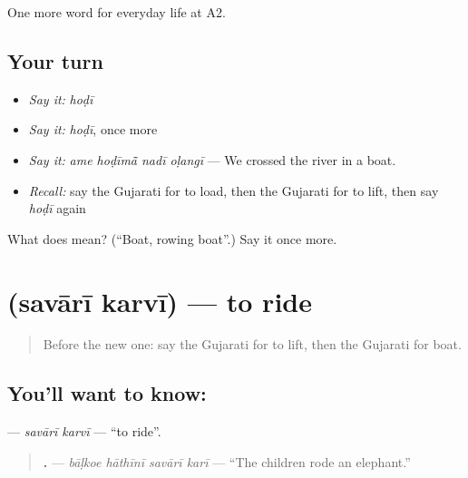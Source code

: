 \begin{grammarlens}[title={What you've built}]
One more word for everyday life at A2.
\end{grammarlens}

\subsection*{Your turn}
\begin{itemize}
\raggedright
  \item \emph{Say it:} \emph{hoḍī}
  \item \emph{Say it:} \emph{hoḍī}, once more
  \item \emph{Say it:} \emph{ame hoḍīmā̃ nadī oḷangī} — We crossed the river in a boat.
  \item \emph{Recall:} say the Gujarati for to load, then the Gujarati for to lift, then say \emph{hoḍī} again
\end{itemize}

\begin{tcolorbox}[breakable,colback=teal!4,colframe=teal!35!black,title={Before you move on}]
What does  mean? (\textquotedblleft{}Boat, rowing boat\textquotedblright{}.) Say it once more.
\end{tcolorbox}
\section[\texorpdfstring{\gu{સવારી} \gu{કરવી} (savārī karvī)}{સવારી કરવી (savārī karvī)}]{  (savārī karvī) — to ride}

\label{lesson:GU-C211-savari-karvi}



\begin{quote}
Before the new one: say the Gujarati for to lift, then the Gujarati for boat.
\end{quote}

\subsection*{You'll want to know:  }
\textbf{ } — \emph{savārī karvī} — \textquotedblleft{}to ride\textquotedblright{}.

\begin{quote}
\textbf{   .} — \emph{bāḷkoe hāthīnī savārī karī} — \textquotedblleft{}The children rode an elephant.\textquotedblright{}
\end{quote}

